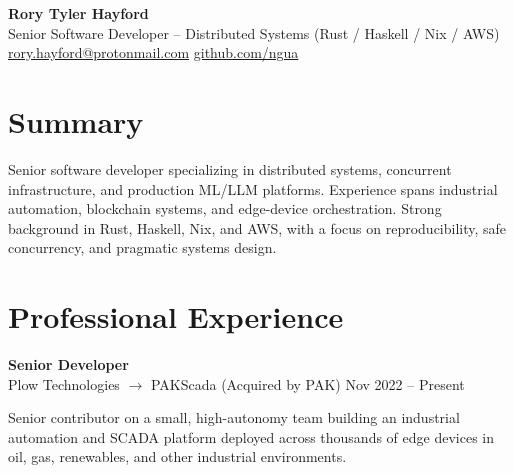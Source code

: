 \documentclass[11pt]{article}
\begin{document}
\begin{center}
    {\LARGE \textbf{Rory Tyler Hayford}}\\
    \vspace{4pt}
    Senior Software Developer -- Distributed Systems (Rust / Haskell / Nix / AWS)\\
    \vspace{4pt}
    \href{mailto:rory.hayford@protonmail.com}{rory.hayford@protonmail.com} \quad
    \href{https://github.com/ngua}{github.com/ngua}
\end{center}

\vspace{8pt}

\section*{Summary}

Senior software developer specializing in distributed systems, concurrent infrastructure, and production ML/LLM platforms. Experience spans industrial automation, blockchain systems, and edge-device orchestration. Strong background in Rust, Haskell, Nix, and AWS, with a focus on reproducibility, safe concurrency, and pragmatic systems design.

\section*{Professional Experience}

\textbf{Senior Developer} \\
Plow Technologies $\rightarrow$ PAKScada (Acquired by PAK) \hfill Nov 2022 -- Present

Senior contributor on a small, high-autonomy team building an industrial automation and SCADA platform deployed across thousands of edge devices in oil, gas, renewables, and other industrial environments.
\end{document}
